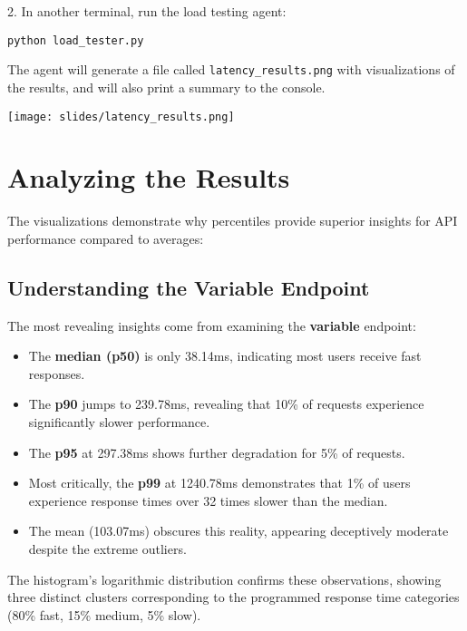 \documentclass[12pt,letterpaper]{article}
\newenvironment{macterminal}{%
    \begin{mdframed}[
        linecolor=terminalFrame,
        backgroundcolor=terminalBg,
        roundcorner=5pt,
        skipabove=10pt,
        skipbelow=10pt,
        linewidth=1pt,
        innertopmargin=10pt, %
        frametitle={%
            \tikz[baseline=(current bounding box.east), outer sep=0pt]{
                \fill[red!80!black] (0,0) circle (5pt);
                \fill[yellow!80!black] (0.7,0) circle (5pt);
                \fill[green!70!black] (1.4,0) circle (5pt);
            }
        },
        frametitlealignment=\raggedright, %
        frametitleaboveskip=8pt, %
        frametitlebelowskip=0pt, %
    ]
}{%
    \end{mdframed}%
}
\begin{document}
2. In another terminal, run the load testing agent:
\begin{macterminal}
\begin{lstlisting}
python load_tester.py
\end{lstlisting}
\end{macterminal}

The agent will generate a file called \verb|latency_results.png| with visualizations of the results, and will also print a summary to the console.

{\centering
\texttt{[image: slides/latency\_results.png]}\par
}

\section{Analyzing the Results}

The visualizations demonstrate why percentiles provide superior insights for API performance compared to averages:

\subsection{Understanding the Variable Endpoint}

The most revealing insights come from examining the \textbf{\textcolor{accentColor}{variable}} endpoint:

\begin{itemize}
    \item The \textbf{median (p50)} is only 38.14ms, indicating most users receive fast responses.
    \item The \textbf{p90} jumps to 239.78ms, revealing that 10\% of requests experience significantly slower performance.
    \item The \textbf{p95} at 297.38ms shows further degradation for 5\% of requests.
    \item Most critically, the \textbf{p99} at 1240.78ms demonstrates that 1\% of users experience response times over 32 times slower than the median.
    \item The mean (103.07ms) obscures this reality, appearing deceptively moderate despite the extreme outliers.
\end{itemize}

The histogram's logarithmic distribution confirms these observations, showing three distinct clusters corresponding to the programmed response time categories (80\% fast, 15\% medium, 5\% slow).
\end{document}
